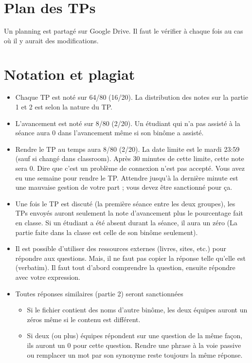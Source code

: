 \documentclass[11pt, a4paper]{article}
\begin{document}
\section{Plan des TPs}

Un planning est partagé sur Google Drive. 
Il faut le vérifier à chaque fois au cas où il y aurait des modifications.


\section{Notation et plagiat}

\begin{itemize}
	\item Chaque TP est noté sur 64/80 (16/20). La distribution des notes sur la partie 1 et 2 est selon la nature du TP.
	\item L'avancement est noté sur 8/80 (2/20). 
	Un étudiant qui n'a pas assisté à la séance aura 0 dans l'avancement même si son binôme a assisté.
	\item Rendre le TP au temps aura 8/80 (2/20). 
	La date limite est le mardi 23:59 (sauf si changé dans classroom).
	Après 30 minutes de cette limite, cette note sera 0.
	Dire que c'est un problème de connexion n'est pas accepté. 
	Vous avez eu une semaine pour rendre le TP.
	Attendre jusqu'à la dernière minute est une mauvaise gestion de votre part ; vous devez être sanctionné pour ça. 
	\item Une fois le TP est discuté (la première séance entre les deux groupes), les TPs envoyés auront seulement la note d'avancement plus le pourcentage fait en classe.
	Si un étudiant a été absent durant la séance, il aura un zéro (La partie faite dans la classe est celle de son binôme seulement).
	\item Il est possible d'utiliser des ressources externes (livres, sites, etc.) pour répondre aux questions. 
	Mais, il ne faut pas copier la réponse telle qu'elle est (verbatim).
	Il faut tout d'abord comprendre la question, ensuite répondre avec votre expression. 
	\item Toutes réponses similaires (partie 2) seront sanctionnées
	\begin{itemize}
		\item Si le fichier contient des noms d'autre binôme, les deux équipes auront un zéros même si le contenu est différent.
		\item Si deux (ou plus) équipes répondent sur une question de la même façon, ils auront un 0 pour cette question.
		Rendre une phrase à la voie passive ou remplacer un mot par son synonyme reste toujours la même réponse.

\end{itemize}
\end{itemize}
\end{document}
